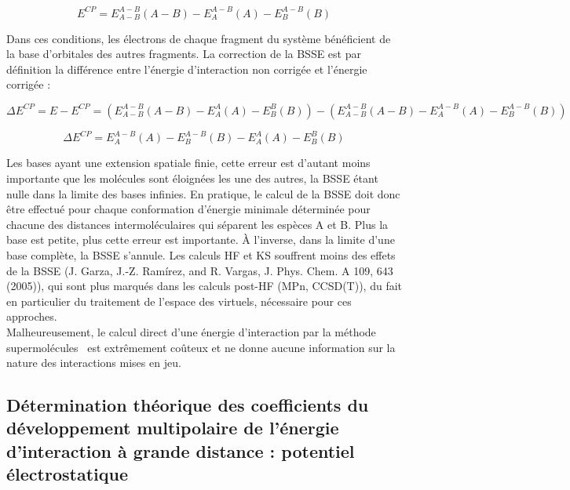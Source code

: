 	\begin{equation}
	E^{CP} = E_{A-B}^{A-B}(A-B) - E_{A}^{A-B}(A) - E_{B}^{A-B}(B)
	\end{equation}
	
	Dans ces conditions, les électrons de chaque fragment du système bénéficient de la base d'orbitales des autres fragments. La correction de la BSSE est par définition la différence entre l'énergie d'interaction non corrigée et l'énergie corrigée :
	
	\begin{equation}
	\Delta E^{CP} = E - E^{CP} = (E_{A-B}^{A-B}(A-B) - E_{A}^{A}(A) - E_{B}^{B}(B)) - (E_{A-B}^{A-B}(A-B) - E_{A}^{A-B}(A) - E_{B}^{A-B}(B))
	\end{equation}
	
	\begin{equation}
	\Delta E^{CP} =  E_{A}^{A-B}(A) - E_{B}^{A-B}(B) - E_{A}^{A}(A) - E_{B}^{B}(B)
	\end{equation}
	
	Les bases ayant une extension spatiale finie, cette erreur est d'autant moins importante que les molécules sont éloignées les une des autres, la BSSE étant nulle dans la limite des bases infinies. En pratique, le calcul de la BSSE doit donc être effectué pour chaque conformation d’énergie minimale déterminée pour chacune des distances intermoléculaires qui séparent les espèces A et B. Plus la base est petite, plus cette erreur est importante. À l'inverse, dans la limite d’une base complète, la BSSE s’annule.
	Les calculs HF et KS souffrent moins des effets de la BSSE (J. Garza, J.-Z. Ramírez, and R. Vargas, J. Phys. Chem. A 109, 643 (2005)), qui sont plus marqués dans les calculs post-HF (MPn, CCSD(T)), du fait en particulier du traitement de l’espace des virtuels, nécessaire pour ces approches.\\
	
	
	Malheureusement, le calcul direct d’une énergie d’interaction par la méthode \og supermolécules \fg{} est extrêmement coûteux et ne donne aucune information sur la nature des interactions mises en jeu.\\
	
	\subsection{Détermination théorique des coefficients du développement multipolaire de l’énergie d'interaction à grande distance : potentiel électrostatique}
	
